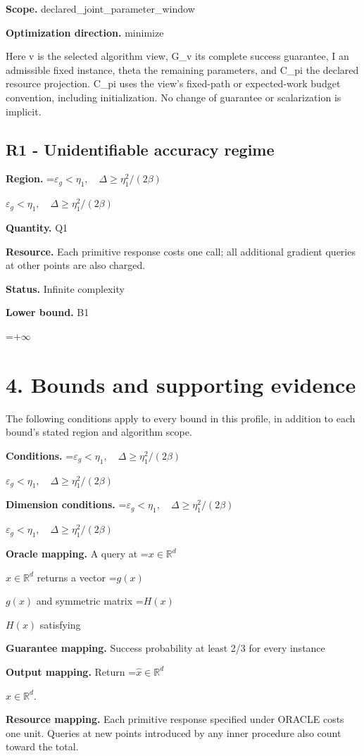 \documentclass[10pt,a4paper]{article}
\newcommand{\AtlasMath}[1]{\par\begingroup\centering\setbox0=\hbox{$\displaystyle #1$}\ifdim\wd0>1.4\linewidth\typeout{ATLAS WIDE FORMULA: \the\wd0}\fi\ifdim\wd0>\linewidth\resizebox{\linewidth}{!}{\box0}\else\box0\fi\par\endgroup}
\newcommand{\AtlasInlineMath}[1]{\begingroup\setbox0=\hbox{$#1$}\ifdim\wd0>.4\linewidth\endgroup\AtlasMath{#1}\else\endgroup$#1$\fi}
\begin{document}
\textbf{Scope.} declared\_joint\_parameter\_window

\textbf{Optimization direction.} minimize

Here v is the selected algorithm view, G\_v its complete success guarantee, I an admissible fixed instance, theta the remaining parameters, and C\_pi the declared resource projection. C\_pi uses the view's fixed-path or expected-work budget convention, including initialization. No change of guarantee or scalarization is implicit.

\subsection{R1 - Unidentifiable accuracy regime}
\textbf{Region.} \AtlasInlineMath{\varepsilon_g<\eta_1,\quad\Delta\ge\eta_1^2/(2\beta)}

\textbf{Quantity.} Q1

\textbf{Resource.} Each primitive response costs one call; all additional gradient queries at other points are also charged.

\textbf{Status.} Infinite complexity

\textbf{Lower bound.} B1

\AtlasMath{+\infty}
\section{4. Bounds and supporting evidence}
The following conditions apply to every bound in this profile, in addition to each bound's stated region and algorithm scope.

\textbf{Conditions.} \AtlasInlineMath{\varepsilon_g<\eta_1,\quad\Delta\ge\eta_1^2/(2\beta)}

\textbf{Dimension conditions.} \AtlasInlineMath{\varepsilon_g<\eta_1,\quad\Delta\ge\eta_1^2/(2\beta)}

\textbf{Oracle mapping.} A query at \AtlasInlineMath{x\in\mathbb{R}^d} returns a vector \AtlasInlineMath{g(x)} and symmetric matrix \AtlasInlineMath{H(x)} satisfying

\textbf{Guarantee mapping.} Success probability at least 2/3 for every instance

\textbf{Output mapping.} Return \AtlasInlineMath{\widehat{x}\in \mathbb{R}^d}.

\textbf{Resource mapping.} Each primitive response specified under ORACLE costs one unit. Queries at new points introduced by any inner procedure also count toward the total.
\end{document}
